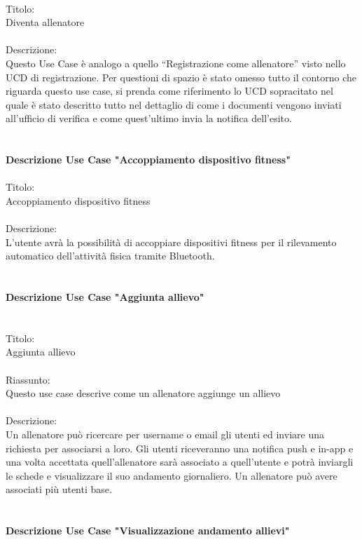 \documentclass{article}
\begin{document}
\\
Titolo:\\
Diventa allenatore\\
\\
Descrizione:\\
Questo Use Case è analogo a quello “Registrazione come allenatore” visto nello UCD di registrazione. Per questioni di spazio è stato omesso tutto il
contorno che riguarda questo use case, si prenda come riferimento lo UCD sopracitato nel quale è stato descritto tutto nel dettaglio di come i
documenti vengono inviati all’ufficio di verifica e come quest’ultimo invia la notifica dell’esito.\\
\\
\\
\textbf{Descrizione Use Case "Accoppiamento dispositivo fitness"}\\
\\
Titolo:\\
Accoppiamento dispositivo fitness\\
\\
Descrizione:\\
L’utente avrà la possibilità di accoppiare dispositivi fitness per il rilevamento automatico dell’attività fisica tramite Bluetooth.\\
\\
\\
\textbf{Descrizione Use Case "Aggiunta allievo"}\\
\\
\\
Titolo:\\
Aggiunta allievo\\
\\
Riassunto:\\ 
Questo use case descrive come un allenatore aggiunge un allievo\\
\\
Descrizione:\\
Un allenatore può ricercare per username o email gli utenti ed inviare una richiesta per associarsi a loro. Gli utenti riceveranno una notifica
push e in-app e una volta accettata quell’allenatore sarà associato a quell’utente e potrà inviargli le schede e visualizzare il suo andamento
giornaliero. Un allenatore può avere associati più utenti base.\\
\\
\\
\textbf{Descrizione Use Case "Visualizzazione andamento allievi"}\\
\\
\end{document}
